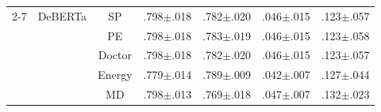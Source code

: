 \begin{table}[h]
\begin{tabular}{@{}llccccc@{}}
\cmidrule(l){2-7}
 & DeBERTa & SP & .798{\scriptsize$\pm$.018} & .782{\scriptsize$\pm$.020} & .046{\scriptsize$\pm$.015} & .123{\scriptsize$\pm$.057} \\
 &  & PE & .798{\scriptsize$\pm$.018} & .783{\scriptsize$\pm$.019} & .046{\scriptsize$\pm$.015} & .123{\scriptsize$\pm$.058} \\
 &  & Doctor & .798{\scriptsize$\pm$.018} & .782{\scriptsize$\pm$.020} & .046{\scriptsize$\pm$.015} & .123{\scriptsize$\pm$.057} \\
 &  & Energy & .779{\scriptsize$\pm$.014} & .789{\scriptsize$\pm$.009} & .042{\scriptsize$\pm$.007} & .127{\scriptsize$\pm$.044} \\
 &  & MD & .798{\scriptsize$\pm$.013} & .769{\scriptsize$\pm$.018} & .047{\scriptsize$\pm$.007} & .132{\scriptsize$\pm$.023} \\
\bottomrule
\end{tabular}
\end{table}

